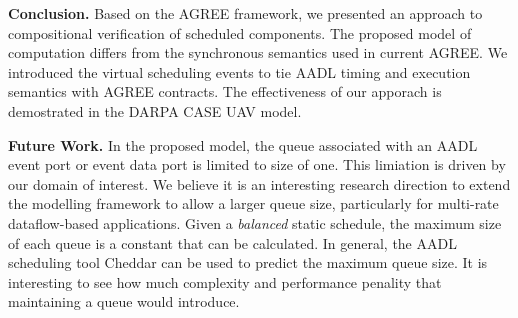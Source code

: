 {\bf Conclusion.}
Based on the AGREE framework, we presented an approach to compositional verification of scheduled components. The proposed model of computation differs from the synchronous semantics used in current AGREE. We introduced the virtual scheduling events to tie AADL timing and execution semantics with AGREE contracts. The effectiveness of our apporach is demostrated in the DARPA CASE UAV model.

{\bf Future Work.}
In the proposed model, the queue associated with an AADL event port or event data port is limited to size of one. This limiation is driven by our domain of interest. We believe it is an interesting research direction to extend the modelling framework to allow a larger queue size, particularly for multi-rate dataflow-based applications. Given a \emph{balanced} static schedule, the maximum size of each queue is a constant that can be calculated. In general, the AADL scheduling tool Cheddar can be used to predict the maximum queue size. It is interesting to see how much complexity and performance penality that maintaining a queue would introduce.